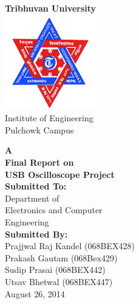 	\begin{center}
		\begin{Huge}
			\textbf{Tribhuvan University}\\
			\includegraphics[scale=1.6]{./Images/logo.png}\\
			Institute of Engineering\\
			Pulchowk Campus\\[1.6cm]		
		\end{Huge}
		\textbf{A\\
		Final Report on\\
		USB Oscilloscope Project}\\[1cm]
		\textbf{Submitted To:}\\
		Department of\\
		Electronics and Computer\\Engineering\\[1.6cm]
	
		\textbf{Submitted By:}\\
		Prajjwal Raj Kandel (068BEX428)\\
		Prakash Gautam (068Bex429)\\
		Sudip Prasai (068BEX442)\\
		Utsav Bhetwal (068BEX447)\\[1.5cm]
		August 26, 2014	
	\end{center}